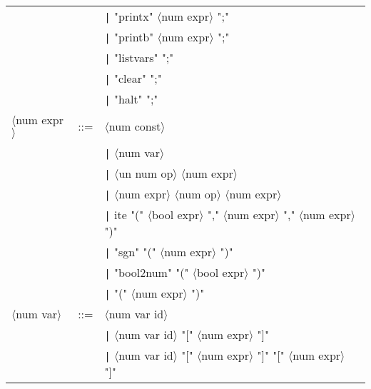 \documentclass[a4paper]{article}
\begin{document}
{\begin{center}
\begin{tabular}{lcl}
            &     & \verb_|_ "printx" $\langle$num expr$\rangle$ ";"                                                                          \\
            &     & \verb_|_ "printb" $\langle$num expr$\rangle$ ";"                                                                          \\
            &     & \verb_|_ "listvars" ";"                                                                                                   \\
            &     & \verb_|_ "clear" ";"                                                                                                      \\
            &     & \verb_|_ "halt" ";"                                                                                                       \\ \hline

$\langle$num expr$\rangle$ & ::= & $\langle$num const$\rangle$                                                                                \\
             &     &     \verb_|_ $\langle$num var$\rangle$                                                                                   \\
             &     &     \verb_|_ $\langle$un num op$\rangle$ $\langle$num expr$\rangle$                                                      \\
             &     &     \verb_|_ $\langle$num expr$\rangle$ $\langle$num op$\rangle$ $\langle$num expr$\rangle$                              \\
             &     &     \verb_|_ ite "(" $\langle$bool expr$\rangle$ "," $\langle$num expr$\rangle$ "," $\langle$num expr$\rangle$")"        \\
             &     &     \verb_|_ "sgn" "(" $\langle$num expr$\rangle$ ")"                                                                    \\
             &     &     \verb_|_ "bool2num" "(" $\langle$bool expr$\rangle$ ")"                                                              \\
             &     &     \verb_|_ "(" $\langle$num expr$\rangle$ ")"                                                                          \\ \hline

$\langle$num var$\rangle$ & ::= & $\langle$num var id$\rangle$                                                                                \\
             &     &     \verb_|_ $\langle$num var id$\rangle$ "[" $\langle$num expr$\rangle$ "]"                                             \\
             &     &     \verb_|_ $\langle$num var id$\rangle$ "[" $\langle$num expr$\rangle$ "]" "[" $\langle$num expr$\rangle$ "]"          \\ \hline


\end{tabular}
\end{center}}
\end{document}
